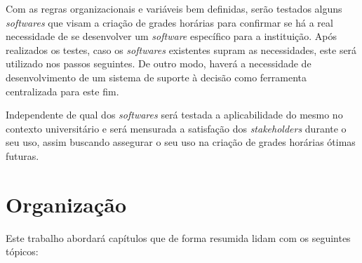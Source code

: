 

Com as regras organizacionais e variáveis bem definidas, serão testados alguns \textit{softwares} que visam a criação de grades horárias para confirmar se há a real necessidade de se desenvolver um \textit{software} específico para a instituição. Após realizados os testes, caso os \textit{softwares} existentes supram as necessidades, este será utilizado nos passos seguintes. De outro modo, haverá a necessidade de desenvolvimento de um sistema de suporte à decisão como ferramenta centralizada para este fim.

Independente de qual dos \textit{softwares} será testada a aplicabilidade do mesmo no contexto universitário e será mensurada a satisfação dos \textit{stakeholders} durante o seu uso, assim buscando assegurar o seu uso na criação de grades horárias ótimas futuras.

\section{Organização} %

Este trabalho abordará capítulos que de forma resumida lidam com os seguintes tópicos:

